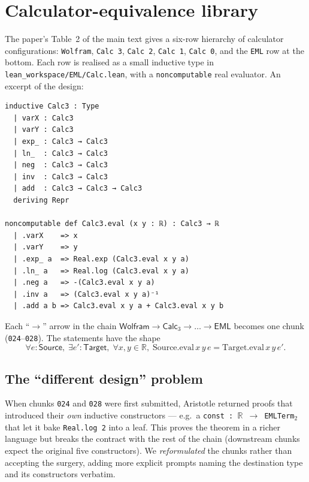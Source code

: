 \documentclass[11pt,a4paper]{article}
\theoremstyle{plain}
\theoremstyle{definition}
\newcommand{\R}{\mathbb{R}}
\begin{document}
\section{Calculator-equivalence library}\label{sec:calc}

The paper's Table~2 of the main text gives a six-row hierarchy of
calculator configurations: \texttt{Wolfram}, \texttt{Calc 3},
\texttt{Calc 2}, \texttt{Calc 1}, \texttt{Calc 0}, and the \texttt{EML}
row at the bottom.  Each row is realised as a small inductive type in
\texttt{lean\_workspace/EML/Calc.lean}, with a \texttt{noncomputable}
real evaluator.  An excerpt of the design:

\begin{lstlisting}
inductive Calc3 : Type
  | varX : Calc3
  | varY : Calc3
  | exp_ : Calc3 → Calc3
  | ln_  : Calc3 → Calc3
  | neg  : Calc3 → Calc3
  | inv  : Calc3 → Calc3
  | add  : Calc3 → Calc3 → Calc3
  deriving Repr

noncomputable def Calc3.eval (x y : ℝ) : Calc3 → ℝ
  | .varX    => x
  | .varY    => y
  | .exp_ a  => Real.exp (Calc3.eval x y a)
  | .ln_ a   => Real.log (Calc3.eval x y a)
  | .neg a   => -(Calc3.eval x y a)
  | .inv a   => (Calc3.eval x y a)⁻¹
  | .add a b => Calc3.eval x y a + Calc3.eval x y b
\end{lstlisting}

Each ``$\to$'' arrow in the chain
$\mathsf{Wolfram}\to\mathsf{Calc}_3\to\dots\to\mathsf{EML}$ becomes one
chunk (\texttt{024}--\texttt{028}).  The statements have the shape
\[
   \forall e : \mathsf{Source},\;\exists e' : \mathsf{Target},\;
   \forall x,y\in\R,\;\mathrm{Source.eval}\,x\,y\,e
   = \mathrm{Target.eval}\,x\,y\,e'.
\]

\subsection{The ``different design'' problem}

When chunks \texttt{024} and \texttt{028} were first submitted,
Aristotle returned proofs that introduced their \emph{own}
inductive constructors --- e.g.~a \texttt{const : $\R$ $\to$ EMLTerm$_2$}
that let it bake \texttt{Real.log 2} into a leaf.  This proves the
theorem in a richer language but breaks the contract with the rest of
the chain (downstream chunks expect the original five constructors).
We \emph{reformulated} the chunks rather than accepting the surgery,
adding more explicit prompts naming the destination type and
its constructors verbatim.
\end{document}
